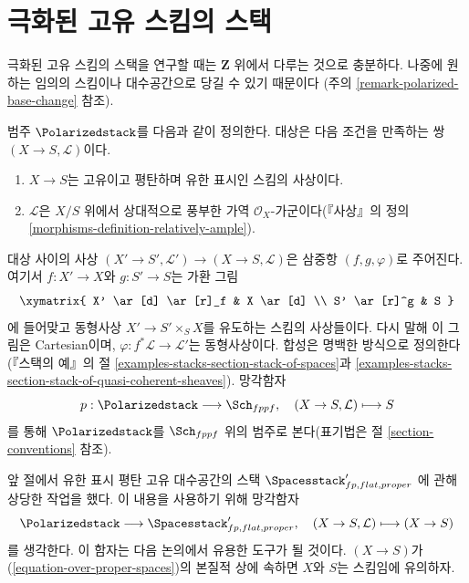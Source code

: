\section{극화된 고유 스킴의 스택}
\label{section-polarized}

\noindent
극화된 고유 스킴의 스택을 연구할 때는 $\mathbf{Z}$ 위에서 다루는 것으로
충분하다. 나중에 원하는 임의의 스킴이나 대수공간으로 당길 수 있기 때문이다
(주의 \ref{remark-polarized-base-change} 참조).

\begin{situation}
\label{situation-polarized}
범주 $\Polarizedstack$를 다음과 같이 정의한다. 대상은 다음 조건을 만족하는
쌍 $(X \to S, \mathcal{L})$이다.
\begin{enumerate}
\item $X \to S$는 고유이고 평탄하며 유한 표시인 스킴의 사상이다.
\item $\mathcal{L}$은 $X/S$ 위에서 상대적으로 풍부한 가역
$\mathcal{O}_X$-가군이다(『사상』의 정의
\ref{morphisms-definition-relatively-ample}).
\end{enumerate}
대상 사이의 사상
$(X' \to S', \mathcal{L}') \to (X \to S, \mathcal{L})$은 삼중항
$(f, g, \varphi)$로 주어진다. 여기서 $f : X' \to X$와 $g : S' \to S$는
가환 그림
$$
\xymatrix{
X' \ar[d] \ar[r]_f & X \ar[d] \\
S' \ar[r]^g & S
}
$$
에 들어맞고 동형사상 $X' \to S' \times_S X$를 유도하는 스킴의 사상들이다.
다시 말해 이 그림은 Cartesian이며,
$\varphi : f^*\mathcal{L} \to \mathcal{L}'$는 동형사상이다. 합성은 명백한
방식으로 정의한다(『스택의 예』의 절
\ref{examples-stacks-section-stack-of-spaces}과
\ref{examples-stacks-section-stack-of-quasi-coherent-sheaves}).
망각함자
$$
p : \Polarizedstack \longrightarrow \Sch_{fppf},\quad
(X \to S, \mathcal{L}) \longmapsto S
$$
를 통해 $\Polarizedstack$를 $\Sch_{fppf}$ 위의 범주로 본다(표기법은 절
\ref{section-conventions} 참조).
\end{situation}

\noindent
앞 절에서 유한 표시 평탄 고유 대수공간의 스택
$\Spacesstack'_{fp, flat, proper}$
에 관해 상당한 작업을 했다. 이 내용을 사용하기 위해 망각함자
\begin{equation}
\label{equation-over-proper-spaces}
\Polarizedstack \longrightarrow
\Spacesstack'_{fp, flat, proper},\quad
(X \to S, \mathcal{L}) \longmapsto (X \to S)
\end{equation}
를 생각한다. 이 함자는 다음 논의에서 유용한 도구가 될 것이다.
$(X \to S)$가 (\ref{equation-over-proper-spaces})의 본질적 상에 속하면
$X$와 $S$는 스킴임에 유의하자.


